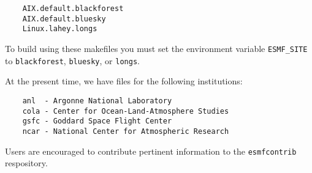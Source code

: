 \begin{verbatim}
	AIX.default.blackforest
	AIX.default.bluesky
	Linux.lahey.longs
\end{verbatim}

To build using these makefiles you must set the environment 
variable {\tt ESMF\_SITE} to {\tt blackforest}, {\tt bluesky}, or {\tt longs}.

At the present time, we have files for the following institutions:

\begin{verbatim}
	anl  - Argonne National Laboratory
	cola - Center for Ocean-Land-Atmosphere Studies
	gsfc - Goddard Space Flight Center
	ncar - National Center for Atmospheric Research
\end{verbatim}


Users are encouraged to contribute pertinent information to the 
{\tt esmfcontrib} respository.




